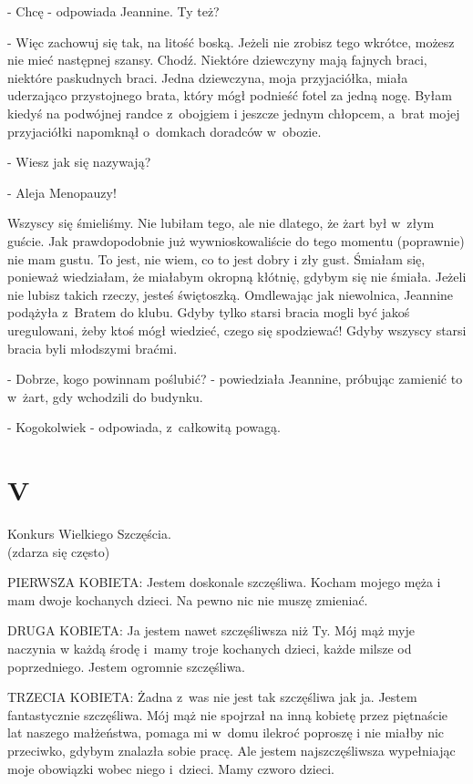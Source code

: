 \documentclass[oneside,polish,12pt,sfheadings]{mwbk}
\begin{document}
- Chcę - odpowiada Jeannine. Ty też?

- Więc zachowuj się tak, na litość boską. Jeżeli nie zrobisz tego
wkrótce, możesz nie mieć następnej szansy. Chodź. Niektóre dziewczyny
mają fajnych braci, niektóre paskudnych braci. Jedna dziewczyna, moja
przyjaciółka, miała uderzająco przystojnego brata, który mógł podnieść
fotel za jedną nogę. Byłam kiedyś na podwójnej randce z~obojgiem i
jeszcze jednym chłopcem, a~brat mojej przyjaciółki napomknął o~domkach
doradców w~obozie. 

- Wiesz jak się nazywają?

- Aleja Menopauzy!

Wszyscy się śmieliśmy. Nie lubiłam tego, ale nie dlatego, że żart
był w~złym guście. Jak prawdopodobnie już wywnioskowaliście do tego
momentu (poprawnie) nie mam gustu. To jest, nie wiem, co to jest dobry
i zły gust. Śmiałam się, ponieważ wiedziałam, że miałabym okropną
kłótnię, gdybym się nie śmiała. Jeżeli nie lubisz takich rzeczy, jesteś
świętoszką. Omdlewając jak niewolnica, Jeannine podążyła z~Bratem
do klubu. Gdyby tylko starsi bracia mogli być jakoś uregulowani, żeby
ktoś mógł wiedzieć, czego się spodziewać! Gdyby wszyscy starsi bracia
byli młodszymi braćmi. 

- Dobrze, kogo powinnam poślubić? - powiedziała
Jeannine, próbując zamienić to w~żart, gdy wchodzili do budynku. 

- Kogokolwiek - odpowiada, z~całkowitą powagą.

\chapter{V}

Konkurs Wielkiego Szczęścia.\\

(zdarza się często)

PIERWSZA KOBIETA: Jestem doskonale szczęśliwa. Kocham mojego męża
i mam dwoje kochanych dzieci. Na pewno nic nie muszę zmieniać.

DRUGA KOBIETA: Ja jestem nawet szczęśliwsza niż Ty. Mój mąż myje naczynia
w każdą środę i~mamy troje kochanych dzieci, każde milsze od poprzedniego.
Jestem ogromnie szczęśliwa.

TRZECIA KOBIETA: Żadna z~was nie jest tak szczęśliwa jak ja. Jestem
fantastycznie szczęśliwa. Mój mąż nie spojrzał na inną kobietę przez
piętnaście lat naszego małżeństwa, pomaga mi w~domu ilekroć poproszę
i nie miałby nic przeciwko, gdybym znalazła sobie pracę. Ale jestem
najszczęśliwsza wypełniając moje obowiązki wobec niego i~dzieci. Mamy
czworo dzieci.
\end{document}
